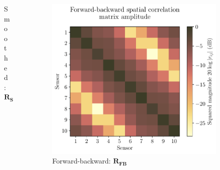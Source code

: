 \documentclass[UKenglish,8pt,aspectratio=1610]{beamer}
\begin{document}
\begin{frame}
\begin{columns}
\begin{column}{0.33\textwidth}
\begin{figure}[h!]
				\caption{Smoothed: $\mathbf{R_S}$}
			\end{figure}
		\end{column}
		\begin{column}{0.33\textwidth}
			\begin{figure}[h!]
				\centering
				\includegraphics[scale=0.3]{question8/matrices/forward_backward_spatial_correlation_matrix_amplitude}
				\caption{Forward-backward: $\mathbf{R_{FB}}$}
			\end{figure}
		\end{column}
	\end{columns}
	

\end{frame}
\end{document}

